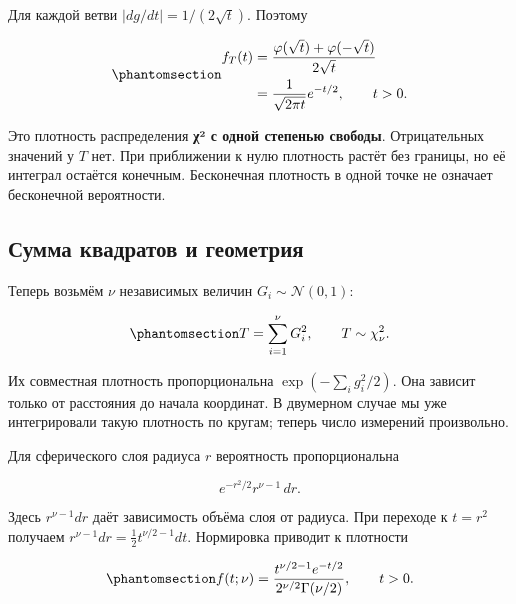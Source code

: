 \documentclass[
  russian,
  11pt,
  a4paper,
  open=any]{scrbook}
\begin{document}
\begin{bookderivation}

Для каждой ветви \(|dg/dt|=1/(2\sqrt t)\). Поэтому

\begin{equation}\protect\phantomsection\label{eq-ch13-chi-square-one}{
\begin{aligned}
f_T(t)
&=\frac{\varphi(\sqrt t)+\varphi(-\sqrt t)}{2\sqrt t}\\
&=\frac{1}{\sqrt{2\pi t}}e^{-t/2},
\qquad t>0.
\end{aligned}
}\end{equation}

\end{bookderivation}

Это плотность распределения \textbf{χ² с одной степенью свободы}.
Отрицательных значений у \(T\) нет. При приближении к нулю плотность
растёт без границы, но её интеграл остаётся конечным. Бесконечная
плотность в одной точке не означает бесконечной вероятности.

\subsection{Сумма квадратов и
геометрия}\label{ux441ux443ux43cux43cux430-ux43aux432ux430ux434ux440ux430ux442ux43eux432-ux438-ux433ux435ux43eux43cux435ux442ux440ux438ux44f}

Теперь возьмём \(\nu\) независимых величин \(G_i\sim\mathcal N(0,1)\):

\begin{equation}\protect\phantomsection\label{eq-ch13-chi-square-sum}{
T=\sum_{i=1}^{\nu}G_i^2,
\qquad T\sim\chi^2_\nu.
}\end{equation}

Их совместная плотность пропорциональна \(\exp(-\sum_i g_i^2/2)\). Она
зависит только от расстояния до начала координат. В двумерном случае мы
уже интегрировали такую плотность по кругам; теперь число измерений
произвольно.

\begin{bookderivation}

Для сферического слоя радиуса \(r\) вероятность пропорциональна

\[
e^{-r^2/2}r^{\nu-1}\,dr.
\]

Здесь \(r^{\nu-1}dr\) даёт зависимость объёма слоя от радиуса. При
переходе к \(t=r^2\) получаем \(r^{\nu-1}dr=\tfrac12t^{\nu/2-1}dt\).
Нормировка приводит к плотности

\begin{equation}\protect\phantomsection\label{eq-chi-square-density}{
f(t;\nu)=
\frac{t^{\nu/2-1}e^{-t/2}}{2^{\nu/2}\Gamma(\nu/2)},
\qquad t>0.
}\end{equation}

\end{bookderivation}
\end{document}
